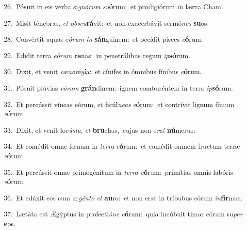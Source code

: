 {\numbfont\textcolor{\numbcolor}{26.}}~Pósuit in eis verba si\-\textit{gnó}\-\textit{rum} \textit{su}\-\textbf{ó}rum:~\star et prodigiórum \textit{in} \textbf{ter}\-ra Cham.\par
{\numbfont\textcolor{\numbcolor}{27.}}~Misit ténebras, \textit{et} \textit{obs}\-\textit{cu}\textbf{rá}vit:~\star et non exacerbávit sermó\textit{nes} \textbf{su}\-os.\par
{\numbfont\textcolor{\numbcolor}{28.}}~Convértit aquas e\-\textit{ó}\-\textit{rum} \textit{in} \textbf{sán}\-guinem:~\star et occídit pisces \textit{e}\-\textbf{ó}rum.\par
{\numbfont\textcolor{\numbcolor}{29.}}~Edidit terra \textit{e}\-\textit{ó}\textit{rum} \textbf{ra}\-nas:~\star in penetrálibus regum \textit{ip}\-\textbf{só}rum.\par
{\numbfont\textcolor{\numbcolor}{30.}}~Dixit, et venit \textit{cœ}\-\textit{no}\textit{my}\textbf{í}a:~\star et cínifes in ómnibus fínibus \textit{e}\-\textbf{ó}rum.\par
{\numbfont\textcolor{\numbcolor}{31.}}~Pósuit plúvias \textit{e}\-\textit{ó}\textit{rum} \textbf{grán}\-dinem:~\star ignem comburéntem in terra \textit{ip}\-\textbf{só}rum.\par
{\numbfont\textcolor{\numbcolor}{32.}}~Et percússit víneas eórum, et ficúl\-\textit{ne}\-\textit{as} \textit{e}\-\textbf{ó}rum:~\star et contrívit lignum fínium \textit{e}\-\textbf{ó}rum.\par
{\numbfont\textcolor{\numbcolor}{33.}}~Dixit, et venit lo\-\textit{cús}\-\textit{ta}, \textit{et} \textbf{bru}\-chus,~\star cujus non e\textit{rat} \textbf{nú}\-merus:\par
{\numbfont\textcolor{\numbcolor}{34.}}~Et comédit omne fœnum in \textit{ter}\-\textit{ra} \textit{e}\-\textbf{ó}rum:~\star et comédit omnem fructum terræ \textit{e}\-\textbf{ó}rum.\par
{\numbfont\textcolor{\numbcolor}{35.}}~Et percússit omne primogénitum in \textit{ter}\-\textit{ra} \textit{e}\-\textbf{ó}rum:~\star primítias omnis labóris \textit{e}\-\textbf{ó}rum.\par
{\numbfont\textcolor{\numbcolor}{36.}}~Et edúxit eos cum ar\-\textit{gén}\-\textit{to} \textit{et} \textbf{au}\-ro:~\star et non erat in tríbubus eórum \textit{in}\-\textbf{fír}mus.\par
{\numbfont\textcolor{\numbcolor}{37.}}~Lætáta est Ægýptus in profecti\-\textit{ó}\-\textit{ne} \textit{e}\-\textbf{ó}rum:~\star quia incúbuit timor eórum su\textit{per} \textbf{e}\-os.\par
